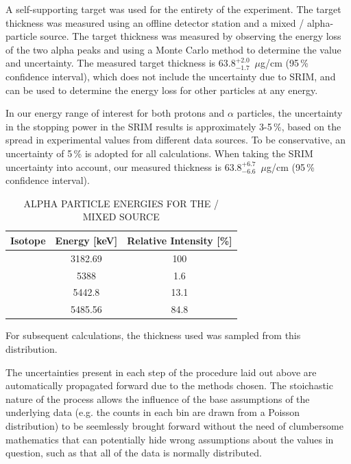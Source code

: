 A self-supporting  target was used for the entirety of the
experiment. The target thickness was measured using an offline detector
station and a mixed / alpha-particle source.
The target thickness was measured by observing the energy loss of the
two alpha peaks and using a Monte Carlo method to determine the value
and uncertainty. The measured target thickness is
$63.8^{+2.0}_{-1.7}$~$\mu$g/cm\squared{} (95\,\% confidence interval),
which does not include the uncertainty due to SRIM, and can be used to
determine the energy loss for other particles at any energy.

In our energy range of interest for both protons and $\alpha$ particles,
the uncertainty in the stopping power in the SRIM results is
approximately 3-5\,\%, based on the spread in experimental values from
different data sources. %
To be conservative, an uncertainty of 5\,\% is
adopted for all calculations. When taking the SRIM uncertainty into
account, our measured thickness is
$63.8^{+6.7}_{-6.6}$~$\mu$g/cm\squared{} (95\,\% confidence interval).


\begin{table}
    \begin{center}
        \caption{ALPHA PARTICLE ENERGIES FOR THE /
            MIXED SOURCE}
        \label{tab:mixed-source}
        \begin{tabular}{rS[table-format=2.4]S[table-format=2.4]}
            \toprule
            \midrule
            {\textbf{Isotope}} & {\textbf{Energy [keV]}} &
                {\textbf{Relative Intensity [\%]}} \\
            \midrule
             & 3182.69 & 100   \\
             & 5388    &   1.6 \\
                          & 5442.8  &  13.1 \\
                          & 5485.56 &  84.8 \\
            \bottomrule
        \end{tabular}
    \end{center}
\end{table}

For subsequent calculations, the thickness used was sampled from this
distribution.

The uncertainties present in each step of the procedure laid out above
are automatically propagated forward due to the methods chosen. The
stoichastic nature of the process allows the influence of the base
assumptions of the underlying data (e.g. the counts in each bin are
drawn from a Poisson distribution) to be seemlessly brought forward
without the need of clumbersome mathematics that can potentially hide
wrong assumptions about the values in question, such as that all of the
data is normally distributed.

